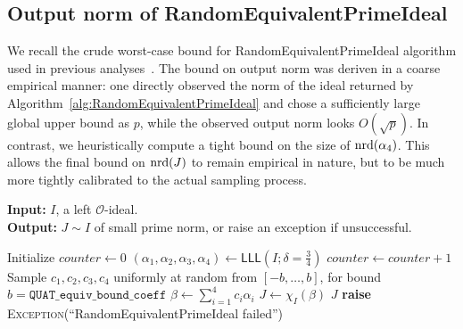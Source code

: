 \subsection{Output norm of RandomEquivalentPrimeIdeal}
\label{subsec:RandomEquivalentPrimeIdeal}

We recall the crude worst-case bound for \textsf{RandomEquivalentPrimeIdeal} algorithm used in previous analyses~\cite{KLKL25}.
The bound on output norm was deriven in a coarse empirical manner:
one directly observed the norm of the ideal returned by Algorithm~\ref{alg:RandomEquivalentPrimeIdeal} and chose a sufficiently large global upper bound as $p$, while the observed output norm looks $O(\sqrt{p})$.
In contrast, we heuristically compute a tight bound on the size of $\mathrm{nrd}(\alpha_4)$.
This allows the final bound on $\mathrm{nrd}(J)$ to remain empirical in nature, but to be much more tightly calibrated to the actual sampling process.

\begin{algorithm}
\caption{\textsf{RandomEquivalentPrimeIdeal}($I$)}
\label{alg:RandomEquivalentPrimeIdeal}
\textbf{Input:} $I$, a left $\mathcal{O}$-ideal.\\
\textbf{Output:} $J \sim I$ of small prime norm, or raise an exception if unsuccessful.
\begin{algorithmic}[1]
\State Initialize $\textit{counter} \gets 0$
\State $(\alpha_{1},\alpha_{2},\alpha_{3},\alpha_{4}) \gets \mathsf{LLL}(I;\delta=\frac34)$
  \State $\textit{counter} \gets \textit{counter} + 1$
  \State Sample $c_{1},c_{2},c_{3},c_{4}$ uniformly at random from $[-b,\ldots,b]$, for bound $b=\texttt{QUAT\_equiv\_bound\_coeff}$
  \State $\beta \gets \sum_{i=1}^{4} c_{i}\alpha_{i}$
  \State $J \gets \chi_{I}(\beta)$
     \State \Return $J$
  \EndIf
\EndWhile
\State \textbf{raise} \textsc{Exception}(``RandomEquivalentPrimeIdeal failed'')
\end{algorithmic}
\end{algorithm}

